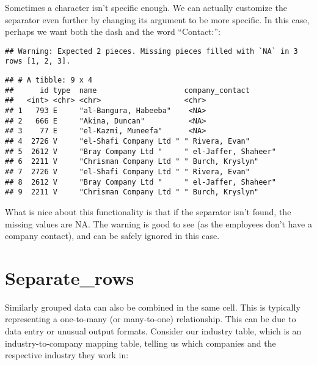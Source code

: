 \documentclass[
]{book}
\newenvironment{Shaded}{\begin{snugshade}}{\end{snugshade}}
\newcommand{\DataTypeTok}[1]{\textcolor[rgb]{0.13,0.29,0.53}{#1}}
\newcommand{\KeywordTok}[1]{\textcolor[rgb]{0.13,0.29,0.53}{\textbf{#1}}}
\newcommand{\NormalTok}[1]{#1}
\newcommand{\OperatorTok}[1]{\textcolor[rgb]{0.81,0.36,0.00}{\textbf{#1}}}
\newcommand{\StringTok}[1]{\textcolor[rgb]{0.31,0.60,0.02}{#1}}
\begin{document}
Sometimes a character isn't specific enough. We can actually customize the separator even further by changing its argument to be more specific. In this case, perhaps we want both the dash and the word ``Contact:'':

\begin{Shaded}
\end{Shaded}

\begin{verbatim}
## Warning: Expected 2 pieces. Missing pieces filled with `NA` in 3 rows [1, 2, 3].
\end{verbatim}

\begin{verbatim}
## # A tibble: 9 x 4
##      id type  name                    company_contact      
##   <int> <chr> <chr>                   <chr>                
## 1   793 E     "al-Bangura, Habeeba"    <NA>                
## 2   666 E     "Akina, Duncan"          <NA>                
## 3    77 E     "el-Kazmi, Muneefa"      <NA>                
## 4  2726 V     "el-Shafi Company Ltd " " Rivera, Evan"      
## 5  2612 V     "Bray Company Ltd "     " el-Jaffer, Shaheer"
## 6  2211 V     "Chrisman Company Ltd " " Burch, Kryslyn"    
## 7  2726 V     "el-Shafi Company Ltd " " Rivera, Evan"      
## 8  2612 V     "Bray Company Ltd "     " el-Jaffer, Shaheer"
## 9  2211 V     "Chrisman Company Ltd " " Burch, Kryslyn"
\end{verbatim}

What is nice about this functionality is that if the separator isn't found, the missing values are NA. The warning is good to see (as the employees don't have a company contact), and can be safely ignored in this case.

\hypertarget{separate_rows}{%
\section{Separate\_rows}\label{separate_rows}}

Similarly grouped data can also be combined in the same cell. This is typically representing a one-to-many (or many-to-one) relationship. This can be due to data entry or unusual output formats. Consider our industry table, which is an industry-to-company mapping table, telling us which companies and the respective industry they work in:
\end{document}
